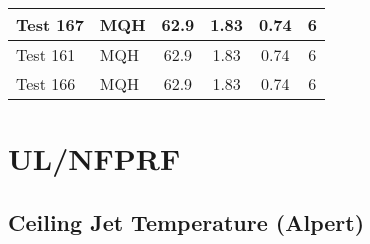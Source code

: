 \begin{table}[!ht]
\begin{center}
\begin{tabular}{|l|l|c|c|c|c|}
Test 167   &  MQH               &  62.9           &  1.83            &  0.74            &  6                    \\ \hline
Test 161   &  MQH               &  62.9           &  1.83            &  0.74            &  6                    \\ \hline
Test 166   &  MQH               &  62.9           &  1.83            &  0.74            &  6                    \\ \hline
\end{tabular}
\end{center}
\end{table}


\clearpage


\section{UL/NFPRF}

\subsection*{Ceiling Jet Temperature (Alpert)}

